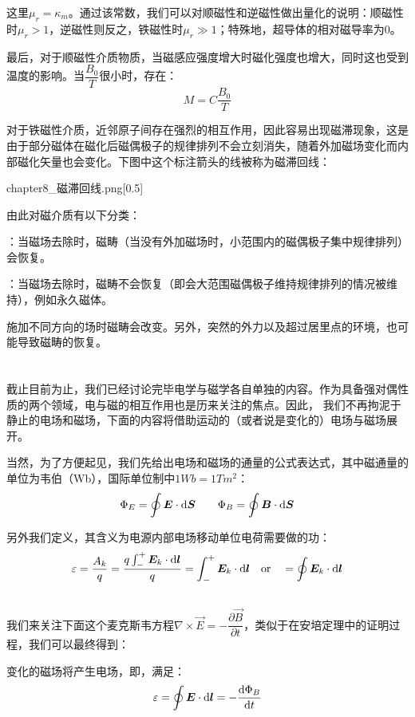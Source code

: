 这里$\mu_r=\kappa_m$。通过该常数，我们可以对顺磁性和逆磁性做出量化的说明：顺磁性时$\mu_r>1$，逆磁性则反之，铁磁性时$\mu_r\gg 1$；特殊地，超导体的相对磁导率为0。

最后，对于顺磁性介质物质，当磁感应强度增大时磁化强度也增大，同时这也受到温度的影响。当$\dfrac{B_0}{T}$很小时，存在：
\[M=C\dfrac{B_0}{T}\]

对于铁磁性介质，近邻原子间存在强烈的相互作用，因此容易出现磁滞现象，这是由于部分磁体在磁化后磁偶极子的规律排列不会立刻消失，随着外加磁场变化而内部磁化矢量也会变化。下图中这个标注箭头的线被称为磁滞回线：
\begin{singlefigure}[磁滞回线]{chapter8_磁滞回线.png}[0.5]
\end{singlefigure}

由此对磁介质有以下分类：
\begin{Itemize}
    \item {}：当磁场去除时，磁畴（当没有外加磁场时，小范围内的磁偶极子集中规律排列）会恢复。
    \item {}：当磁场去除时，磁畴不会恢复（即会大范围磁偶极子维持规律排列的情况被维持），例如永久磁体。
\end{Itemize}

施加不同方向的场时磁畴会改变。另外，突然的外力以及超过居里点的环境，也可能导致磁畴的恢复。
\section[电磁感应与电感]{}
截止目前为止，我们已经讨论完毕电学与磁学各自单独的内容。作为具备强对偶性质的两个领域，电与磁的相互作用也是历来关注的焦点。因此，
我们不再拘泥于静止的电场和磁场，下面的内容将借助运动的（或者说是变化的）电场与磁场展开。

当然，为了方便起见，我们先给出电场和磁场的通量的公式表达式，其中磁通量的单位为韦伯（Wb），国际单位制中$1Wb = 1Tm^2$：
\[\Phi_E = \oint\vec{E}\cdot \dif{\vec{S}} \qquad \Phi_B = \oint\vec{B}\cdot\dif{\vec{S}}\]

另外我们定义，其含义为电源内部电场移动单位电荷需要做的功：
\[\varepsilon = \dfrac{A_k}{q} = \dfrac{q \int_{-}^{+} \vec{E}_k \cdot \dif{\vec{l}}}{q} = \int_{-}^{+} \vec{E}_k \cdot \dif{\vec{l}} \quad\text{or}\quad = \oint \vec{E}_k \cdot \dif{\vec{l}}\]
\subsection[法拉第电磁感应定律与动生电动势]{}
我们来关注下面这个麦克斯韦方程$\nabla \times \vec{E} = -\dfrac{\partial \vec{B}}{\partial t}$，类似于在安培定理中的证明过程，我们可以最终得到：
\begin{law}
    变化的磁场将产生电场，即，满足：
    \[\varepsilon = \oint \vec{E}\cdot\dif{\vec{l}} = -\dfrac{\dif{\Phi_B}}{\dif{t}}\]
\end{law}

